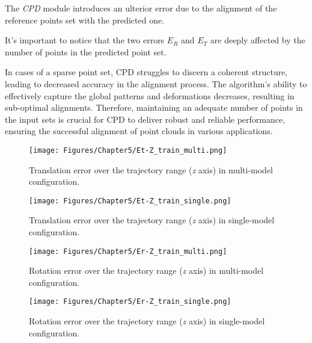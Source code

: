 The \textit{CPD} module introduces an ulterior error due to the alignment of the reference points set with the predicted one.

It's important to notice that the two errors $E_R$ and $E_T$ are deeply affected by the number of points in the predicted point set.

In cases of a sparse point set, CPD struggles to discern a coherent structure, leading to decreased accuracy in the alignment process. The algorithm's ability to effectively capture the global patterns and deformations decreases, resulting in sub-optimal alignments. Therefore, maintaining an adequate number of points in the input sets is crucial for CPD to deliver robust and reliable performance, ensuring the successful alignment of point clouds in various applications.
\begin{figure}[H]
    \centering
    \texttt{[image: Figures/Chapter5/Et-Z\_train\_multi.png]}
    \caption[Translation error in multi-model configuration.]{Translation error over the trajectory range (\textit{z} axis) in multi-model configuration.}
    \label{fig:Et-Z train multi}
\end{figure}
\begin{figure}[H]
    \centering
    \texttt{[image: Figures/Chapter5/Et-Z\_train\_single.png]}
    \caption[Translation error in single-model configuration.]{Translation error over the trajectory range (\textit{z} axis) in single-model configuration.}
    \label{fig:Et-Z train single}
\end{figure}

\newpage
\begin{figure}[H]
    \centering
    \texttt{[image: Figures/Chapter5/Er-Z\_train\_multi.png]}
    \caption[Rotation error in single-model configuration.]{Rotation error over the trajectory range (\textit{z} axis) in multi-model configuration.}
    \label{fig:Er-Z train multi}
\end{figure}
\begin{figure}[H]
    \centering
    \texttt{[image: Figures/Chapter5/Er-Z\_train\_single.png]}
    \caption[Rotation error in single-model configuration.]{Rotation error over the trajectory range (\textit{z} axis) in single-model configuration.}
    \label{fig:Er-Z train single}
\end{figure}

